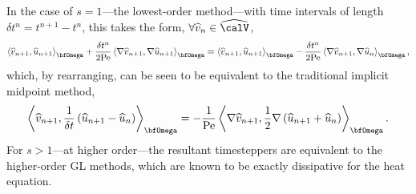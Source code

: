 \begin{example}
        In the case of $s  =  1$—the lowest-order method—with time intervals of length $\delta t^{n} 
         =  t^{n + 1} - t^{n}$, this takes the form, $\forall \widehat{v}_{n}  \in  \widehat{\calV}$,
        \begin{equation}
            \left\langle\widehat{v}_{n + 1}, \widehat{u}_{n + 1}\right\rangle_{\bfOmega} + \frac{\delta t^{n}}{2\rmPe}\left\langle\nabla\widehat{v}_{n + 1}, \nabla\widehat{u}_{n + 1}\right\rangle_{\bfOmega}  =  \left\langle\widehat{v}_{n + 1}, \widehat{u}_{n + 1}\right\rangle_{\bfOmega} - \frac{\delta t^{n}}{2\rmPe}\left\langle\nabla\widehat{v}_{n + 1}, \nabla\widehat{u}_{n}\right\rangle_{\bfOmega},
        \end{equation}
        which, by rearranging, can be seen to be equivalent to the traditional implicit midpoint method,
        \begin{equation}
            \left\langle\widehat{v}_{n + 1}, \frac{1}{\delta t}\left(\widehat{u}_{n + 1} - \widehat{u}_{n}\right)\right\rangle_{\bfOmega}  =  - \frac{1}{\rmPe}\left\langle\nabla\widehat{v}_{n + 1}, \frac{1}{2}\nabla\left(\widehat{u}_{n + 1} + \widehat{u}_{n}\right)\right\rangle_{\bfOmega}.
        \end{equation}
        For $s  >  1$—at higher order—the resultant timesteppers are equivalent to the higher-order GL methods, which are known to be exactly dissipative for the heat equation.
    \end{example}